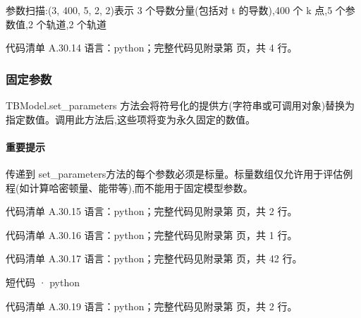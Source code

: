 \documentclass[lang=cn,scheme=chinese,color=blue,device=normal,toc=onecol,math=cm]{elegantbook}
\begin{document}
参数扫描:(3, 400, 5, 2, 2)表示 3 个导数分量(包括对 t 的导数),400 个 k 点,5 个参数值,2 个轨道,2 个轨道\par


\begin{codeindexbox}{代码清单 A.30.14}
语言：python；完整代码见附录第 \pageref{code:30:14} 页，共 4 行。
\end{codeindexbox}


\subsubsection{固定参数}


TBModel.set\_\allowbreak{}parameters 方法会将符号化的提供方(字符串或可调用对象)替换为指定数值。调用此方法后,这些项将变为永久固定的数值。\par


\paragraph{重要提示}


传递到 set\_\allowbreak{}parameters方法的每个参数必须是标量。标量数组仅允许用于评估例程(如计算哈密顿量、能带等),而不能用于固定模型参数。\par


\begin{codeindexbox}{代码清单 A.30.15}
语言：python；完整代码见附录第 \pageref{code:30:15} 页，共 2 行。
\end{codeindexbox}


\begin{codeindexbox}{代码清单 A.30.16}
语言：python；完整代码见附录第 \pageref{code:30:16} 页，共 1 行。
\end{codeindexbox}


\begin{codeindexbox}{代码清单 A.30.17}
语言：python；完整代码见附录第 \pageref{code:30:17} 页，共 42 行。
\end{codeindexbox}


\begin{inlinecodebox}{短代码 · python}
\end{inlinecodebox}


\begin{codeindexbox}{代码清单 A.30.19}
语言：python；完整代码见附录第 \pageref{code:30:19} 页，共 2 行。
\end{codeindexbox}
\end{document}
